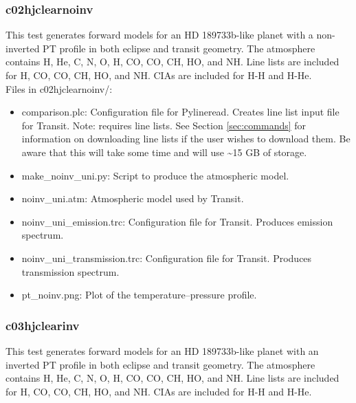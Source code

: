 \documentclass[letterpaper, 12pt]{article}
\begin{document}
\subsubsection{c02hjclearnoinv}
\label{sec:comp-noinv}
This test generates forward models for an HD 189733b-like planet with a non-inverted PT profile in both eclipse and transit geometry. The atmosphere contains H, He, C, N, O, H, 
CO, CO, CH, HO, and NH. Line lists are 
included for H, CO, CO, CH, HO, and NH. CIAs 
are included for H-H and H-He.\\

Files in c02hjclearnoinv/:
\begin{itemize} \itemsep0pt
  \item comparison.plc: Configuration file for Pylineread. Creates 
        line list input file for Transit. Note: requires line lists. See 
        Section \ref{sec:commands} for information on downloading line lists if 
        the user wishes to download them. Be aware that this will take some 
        time and will use {\sim}15 GB of storage.
  \item make{\_}noinv{\_}uni.py: Script to produce the atmospheric model.
  \item noinv{\_}uni.atm: Atmospheric model used by Transit.
  \item noinv{\_}uni{\_}emission.trc: Configuration file for Transit. Produces 
        emission spectrum.
  \item noinv{\_}uni{\_}transmission.trc: Configuration file for Transit. Produces 
        transmission spectrum.
  \item pt{\_}noinv.png: Plot of the temperature--pressure profile.
\end{itemize}

\subsubsection{c03hjclearinv}
\label{sec:comp-inv}
This test generates forward models for an HD 189733b-like planet with an inverted PT profile in both eclipse and transit geometry. The atmosphere contains H, He, C, N, O, H, 
CO, CO, CH, HO, and NH. Line lists are 
included for H, CO, CO, CH, HO, and NH. CIAs 
are included for H-H and H-He.\\
\end{document}
